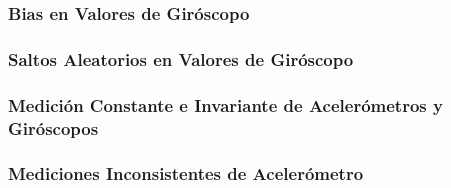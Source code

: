 \subsubsection{Bias en Valores de Giróscopo}

\subsubsection{Saltos Aleatorios en Valores de Giróscopo}

\subsubsection{Medición Constante e Invariante de Acelerómetros y Giróscopos}

\subsubsection{Mediciones Inconsistentes de Acelerómetro}








